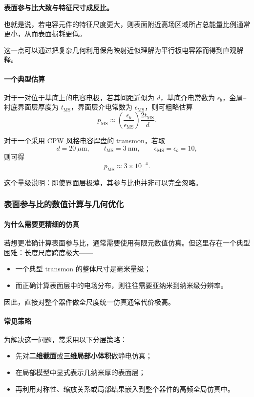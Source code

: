 \documentclass[12pt,a4paper,oneside]{ctexbook}
\begin{document}
\begin{center}
\textbf{表面参与比大致与特征尺寸成反比。}
\end{center}

也就是说，若电容元件的特征尺度更大，则表面附近高场区域所占总能量比例通常更小，从而表面损耗更低。

这一点可以通过把复杂几何利用保角映射近似理解为平行板电容器而得到直观解释。

\paragraph{一个典型估算}
对于一对位于基底上的电容电极，若其间距近似为 \(d\)，基底介电常数为 \(\epsilon_b\)，金属--衬底界面层厚度为 \(t_{\mathrm{MS}}\)，界面层介电常数为 \(\epsilon_{\mathrm{MS}}\)，则可粗略估算
\[
p_{\mathrm{MS}} \approx \left(\frac{\epsilon_b}{\epsilon_{\mathrm{MS}}}\right)\frac{2t_{\mathrm{MS}}}{d}.
\]

对于一个采用 CPW 风格电容焊盘的 transmon，若取
\[
d=20~\mu\mathrm{m},\qquad
t_{\mathrm{MS}}=3~\mathrm{nm},\qquad
\epsilon_{\mathrm{MS}}=\epsilon_b=10,
\]
则可得
\[
p_{\mathrm{MS}} \approx 3\times 10^{-4}.
\]

这个量级说明：即使界面层极薄，其参与比也并非可以完全忽略。

\subsubsection{表面参与比的数值计算与几何优化}

\paragraph{为什么需要更精细的仿真}
若想更准确计算表面参与比，通常需要使用有限元数值仿真。但这里存在一个典型困难：长度尺度跨度极大——
\begin{itemize}
    \item 一个典型 transmon 的整体尺寸是毫米量级；
    \item 而正确计算表面层中的电场分布，则往往需要亚纳米到纳米级分辨率。
\end{itemize}

因此，直接对整个器件做全尺度统一仿真通常代价极高。

\paragraph{常见策略}
为解决这一问题，常采用以下分层策略：
\begin{itemize}
    \item 先对\textbf{二维截面}或\textbf{三维局部小体积}做静电仿真；
    \item 在局部模型中显式表示几纳米厚的表面层；
    \item 再利用对称性、缩放关系或局部结果嵌入到整个器件的高频全局仿真中。
\end{itemize}
\end{document}
